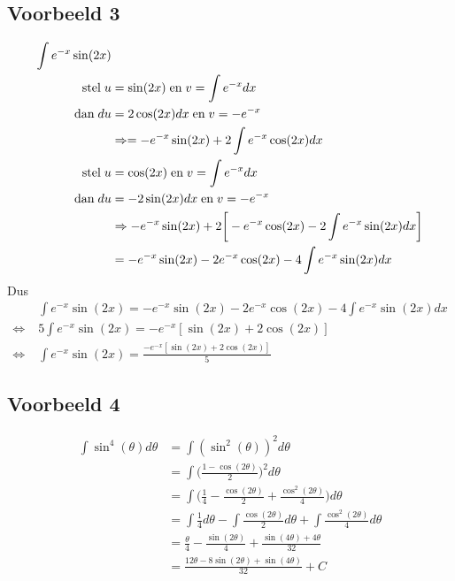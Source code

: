\subsection{Voorbeeld 3}
\begin{equation*}
    \begin{split}
        \int e^{-x}\sin(2x) & \\
        \hbox{stel}\; u & = \sin(2x) \; \hbox{en}\; v = \int e^{-x}dx\\
        \hbox{dan}\; du & = 2\cos(2x)dx \; \hbox{en}\; v = -e^{-x}\\
        & \Rightarrow= -e^{-x}\sin(2x) + 2 \int e^{-x}\cos(2x) dx\\
        \hbox{stel}\; u & = \cos(2x) \; \hbox{en}\; v = \int e^{-x}dx\\
        \hbox{dan}\; du & = -2\sin(2x)dx \; \hbox{en}\; v = -e^{-x}\\
        & \Rightarrow -e^{-x}\sin(2x) + 2\bigg[-e^{-x}\cos(2x)  - 2\int e^{-x}\sin(2x)dx   \bigg]\\
        & = -e^{-x}\sin(2x) - 2e^{-x}\cos(2x) -  4\int e^{-x}\sin(2x)dx\\
    \end{split}
\end{equation*}
Dus
\begin{equation*}
    \begin{split}
        & \int e^{-x}\sin(2x)  = -e^{-x}\sin(2x) - 2e^{-x}\cos(2x) -  4\int e^{-x}\sin(2x)dx \\
        \Leftrightarrow\; &  5\int e^{-x}\sin(2x) = -e^{-x}[\sin(2x) + 2\cos(2x)] \\
        \Leftrightarrow\; & \int e^{-x}\sin(2x) = \frac{-e^{-x}[\sin(2x) + 2\cos(2x)]}{5}
    \end{split}
\end{equation*}
\subsection{Voorbeeld 4}
\begin{equation*}
    \begin{split}
        \int \sin^4(\theta) d\theta & = \int (\sin^2(\theta))^2 d\theta \\
        & = \int \bigg(\frac{1 - \cos(2\theta)}{2}\bigg)^2 d\theta \\
        & = \int \bigg(\frac{1}{4} - \frac{\cos(2\theta)}{2} + \frac{\cos^2(2\theta)}{4} \bigg)d\theta \\
        & = \int \frac{1}{4}d\theta - \int \frac{\cos(2\theta)}{2}d\theta + \int \frac{\cos^2(2\theta)}{4}d\theta \\
        & = \frac{\theta}{4} - \frac{\sin(2\theta)}{4} + \frac{\sin(4\theta) + 4\theta}{32} \\
        & = \frac{12\theta - 8\sin(2\theta) + \sin(4\theta)}{32} + C
    \end{split}
\end{equation*}
